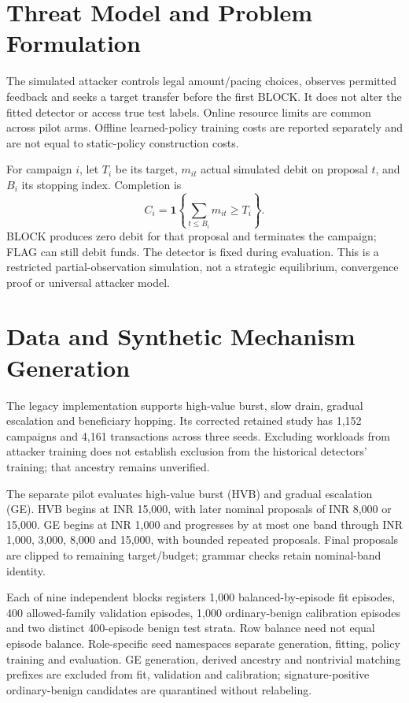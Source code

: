 \documentclass[conference]{IEEEtran}
\begin{document}
\section{Threat Model and Problem Formulation}
The simulated attacker controls legal amount/pacing choices, observes permitted feedback and seeks a target transfer before the first BLOCK. It does not alter the fitted detector or access true test labels. Online resource limits are common across pilot arms. Offline learned-policy training costs are reported separately and are not equal to static-policy construction costs.

For campaign \(i\), let \(T_i\) be its target, \(m_{it}\) actual simulated debit on proposal \(t\), and \(B_i\) its stopping index. Completion is
\begin{equation}
C_i=\mathbf{1}\left\{\sum_{t\leq B_i}m_{it}\geq T_i\right\}.
\end{equation}
BLOCK produces zero debit for that proposal and terminates the campaign; FLAG can still debit funds. The detector is fixed during evaluation. This is a restricted partial-observation simulation, not a strategic equilibrium, convergence proof or universal attacker model.

\section{Data and Synthetic Mechanism Generation}
The legacy implementation supports high-value burst, slow drain, gradual escalation and beneficiary hopping. Its corrected retained study has 1,152 campaigns and 4,161 transactions across three seeds. Excluding workloads from attacker training does not establish exclusion from the historical detectors' training; that ancestry remains unverified.

The separate pilot evaluates high-value burst (HVB) and gradual escalation (GE). HVB begins at INR 15,000, with later nominal proposals of INR 8,000 or 15,000. GE begins at INR 1,000 and progresses by at most one band through INR 1,000, 3,000, 8,000 and 15,000, with bounded repeated proposals. Final proposals are clipped to remaining target/budget; grammar checks retain nominal-band identity.

Each of nine independent blocks registers 1,000 balanced-by-episode fit episodes, 400 allowed-family validation episodes, 1,000 ordinary-benign calibration episodes and two distinct 400-episode benign test strata. Row balance need not equal episode balance. Role-specific seed namespaces separate generation, fitting, policy training and evaluation. GE generation, derived ancestry and nontrivial matching prefixes are excluded from fit, validation and calibration; signature-positive ordinary-benign candidates are quarantined without relabeling.
\end{document}
